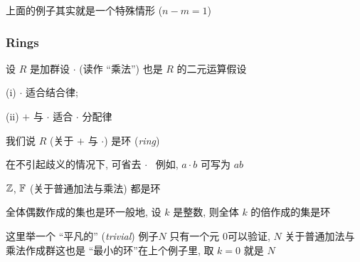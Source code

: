 \begin{remark}
    上面的例子其实就是一个特殊情形 ($n - m = 1$)\period
\end{remark}

\subsubsection*{Rings}

\begin{definition}
    设 $R$ 是加群\period 设 $\cdot$ (读作 ``乘法'') 也是 $R$ 的二元运算\period 假设

    (i) $\cdot$ 适合结合律;

    (ii) $+$ 与 $\cdot$ 适合 $\cdot$ 分配律\period

    我们说 $R$ (关于 $+$ 与 $\cdot$) 是环 (\textit{ring})\period
\end{definition}

\begin{remark}
    在不引起歧义的情况下, 可省去 $\cdot$ \, \period 例如, $a \cdot b$ 可写为 $ab$\period
\end{remark}

\begin{example}
    $\mathbb{Z}$, $\mathbb{F}$ (关于普通加法与乘法) 都是环\period
\end{example}

\begin{example}
    全体偶数作成的集也是环\period 一般地, 设 $k$ 是整数, 则全体 $k$ 的倍作成的集是环\period
\end{example}

\begin{example}
    这里举一个 ``平凡的'' (\textit{trivial}) 例子\period $N$ 只有一个元 $0$\period 可以验证, $N$ 关于普通加法与乘法作成群\period 这也是 ``最小的环''\period 在上个例子里, 取 $k=0$ 就是 $N$\period
\end{example}

